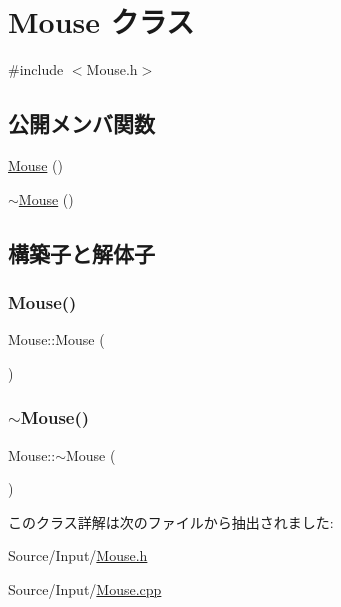 \hypertarget{class_mouse}{}\section{Mouse クラス}
\label{class_mouse}


{\ttfamily \#include $<$Mouse.\+h$>$}

\subsection*{公開メンバ関数}
\begin{DoxyCompactItemize}
\item 
\mbox{\hyperlink{class_mouse_a99024d3700d649ae19c1537b42a3e86d}{Mouse}} ()
\item 
\mbox{\hyperlink{class_mouse_afdf7d8abef29c10be77ead773f964f4f}{$\sim$\+Mouse}} ()
\end{DoxyCompactItemize}


\subsection{構築子と解体子}
\mbox{\label{class_mouse_a99024d3700d649ae19c1537b42a3e86d}} 
\subsubsection{\texorpdfstring{Mouse()}{Mouse()}}
{\footnotesize\ttfamily Mouse\+::\+Mouse (\begin{DoxyParamCaption}{ }\end{DoxyParamCaption})}

\mbox{\label{class_mouse_afdf7d8abef29c10be77ead773f964f4f}} 
\subsubsection{\texorpdfstring{$\sim$\+Mouse()}{~Mouse()}}
{\footnotesize\ttfamily Mouse\+::$\sim$\+Mouse (\begin{DoxyParamCaption}{ }\end{DoxyParamCaption})}



このクラス詳解は次のファイルから抽出されました\+:\begin{DoxyCompactItemize}
\item 
Source/\+Input/\mbox{\hyperlink{_mouse_8h}{Mouse.\+h}}\item 
Source/\+Input/\mbox{\hyperlink{_mouse_8cpp}{Mouse.\+cpp}}\end{DoxyCompactItemize}
